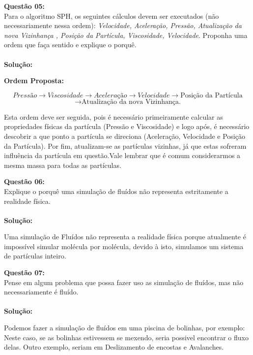 \noindent\textbf{Questão 05:}\\
Para o algoritmo SPH, os seguintes cálculos devem ser executados (não
necessariamente nessa ordem): \textit{Velocidade, Aceleração, Pressão, Atualização da
nova Vizinhança , Posição da Partícula, Viscosidade, Velocidade}. Proponha uma
ordem que faça sentido e explique o porquê.\\
\\
\noindent\textbf{Solução:}

\noindent\textbf{Ordem Proposta:}

\[Pressão \rightarrow Viscosidade \rightarrow Aceleração \rightarrow Velocidade \rightarrow \text{Posição da Partícula}\]
\[\rightarrow \text{Atualização da nova Vizinhança.}\]

Esta ordem deve ser seguida, pois é necessário primeiramente calcular as propriedades físicas da partícula (Pressão e Viscosidade) e logo após, é necessário descobrir a que ponto a partícula se direciona (Aceleração, Velocidade e Posição da Partícula). Por fim, atualizam-se as partículas vizinhas, já que estas sofreram influência da partícula em questão.Vale lembrar que é comum considerarmos a mesma massa para todas as partículas.
\vspace{1cm}

\noindent\textbf{Questão 06:}\\
Explique o porquê uma simulação de fluídos não representa estritamente a realidade física.\\
\\
\noindent\textbf{Solução:}

Uma simulação de Fluídos não representa a realidade física porque atualmente é impossível  simular molécula por molécula, devido à isto, simulamos um sistema de partículas inteiro.

\vspace{1cm}

\noindent\textbf{Questão 07:}\\
Pense em algum problema que possa fazer uso as simulação de fluídos, mas não necessariamente é fluído. \\
\\
\noindent\textbf{Solução:}

Podemos fazer a simulação de fluídos em uma piscina de bolinhas, por exemplo: Neste caso, se as bolinhas estivessem se mexendo,  seria possivel encontrar o fluxo delas. Outro exemplo, seriam em Deslizamento de encostas e Avalanches.

